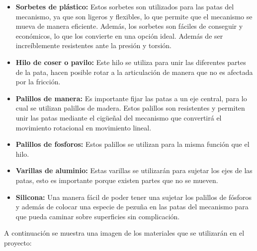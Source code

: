 \begin{itemize}
  \item \textbf{Sorbetes de plástico:} Estos sorbetes son utilizados para las patas del mecanismo, ya que son ligeros y flexibles, lo que permite que el mecanismo se mueva de manera eficiente. Además, los sorbetes son fáciles de conseguir y económicos, lo que los convierte en una opción ideal. Además de ser increíblemente resistentes ante la presión y torsión.
  
  \item \textbf{Hilo de coser o pavilo:} Este hilo se utiliza para unir las diferentes partes de la pata, hacen posible rotar a la articulación de manera que no es afectada por la fricción.
  
  \item \textbf{Palillos de manera:} Es importante fijar las patas a un eje central, para lo cual se utilizan palillos de madera. Estos palillos son resistentes y permiten unir las patas mediante el cigüeñal del mecanismo que convertirá el movimiento rotacional en movimiento lineal.
  
  \item \textbf{Palillos de fosforos:} Estos palillos se utilizan para la misma función que el hilo.
  
  \item \textbf{Varillas de aluminio:} Estas varillas se utilizarán para sujetar los ejes de las patas, esto es importante porque existen partes que no se mueven.
  
  \item \textbf{Silicona:} Una manera fácil de poder tener una sujetar los palillos de fósforos y además de colocar una especie de pezuña en las patas del mecanismo para que pueda caminar sobre superficies sin complicación.
\end{itemize}

A continuación se muestra una imagen de los materiales que se utilizarán en el proyecto:

